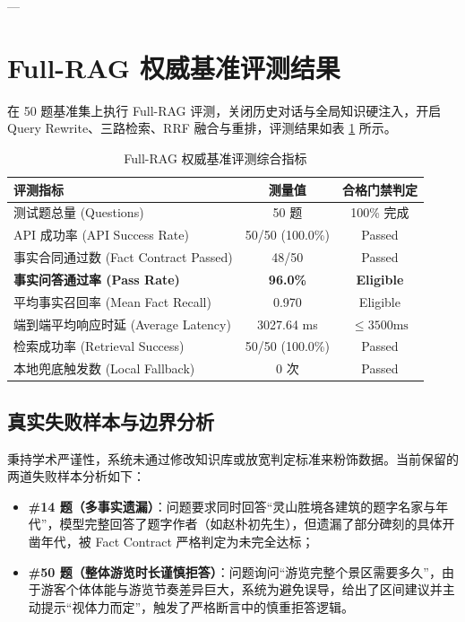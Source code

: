 \documentclass[11pt,a4paper]{ctexart}
\begin{document}
---

\section{Full-RAG 权威基准评测结果}

在 50 题基准集上执行 Full-RAG 评测，关闭历史对话与全局知识硬注入，开启 Query Rewrite、三路检索、RRF 融合与重排，评测结果如表 \ref{tab:rag_baseline} 所示。

\begin{table}[htbp]
\centering
\small
\caption{Full-RAG 权威基准评测综合指标}
\label{tab:rag_baseline}
\begin{tabularx}{0.85\textwidth}{Xcc}
\toprule
\textbf{评测指标} & \textbf{测量值} & \textbf{合格门禁判定} \\
\midrule
测试题总量 (Questions) & 50 题 & 100\% 完成 \\
API 成功率 (API Success Rate) & 50/50 (100.0\%) & Passed \\
事实合同通过数 (Fact Contract Passed) & 48/50 & Passed \\
\textbf{事实问答通过率 (Pass Rate)} & \textbf{96.0\%} & \textbf{Eligible} \\
平均事实召回率 (Mean Fact Recall) & 0.970 & Eligible \\
端到端平均响应时延 (Average Latency) & 3027.64 ms & $\le 3500\text{ms}$ \\
检索成功率 (Retrieval Success) & 50/50 (100.0\%) & Passed \\
本地兜底触发数 (Local Fallback) & 0 次 & Passed \\
\bottomrule
\end{tabularx}
\end{table}

\subsection{真实失败样本与边界分析}
秉持学术严谨性，系统未通过修改知识库或放宽判定标准来粉饰数据。当前保留的两道失败样本分析如下：
\begin{itemize}
    \item \textbf{\#14 题（多事实遗漏）}：问题要求同时回答“灵山胜境各建筑的题字名家与年代”，模型完整回答了题字作者（如赵朴初先生），但遗漏了部分碑刻的具体开凿年代，被 Fact Contract 严格判定为未完全达标；
    \item \textbf{\#50 题（整体游览时长谨慎拒答）}：问题询问“游览完整个景区需要多久”，由于游客个体体能与游览节奏差异巨大，系统为避免误导，给出了区间建议并主动提示“视体力而定”，触发了严格断言中的慎重拒答逻辑。
\end{itemize}
\end{document}
